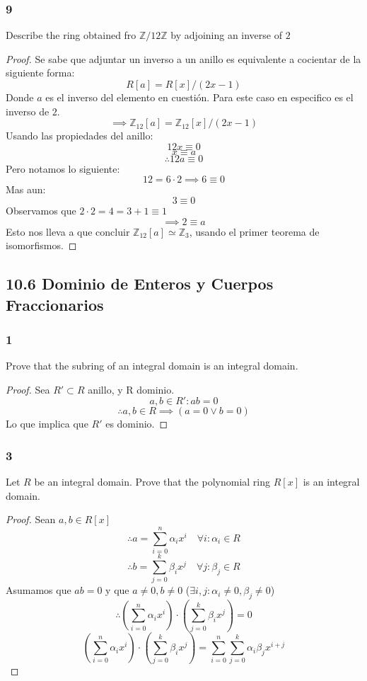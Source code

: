 \documentclass[11pt]{article}
\newcommand{\set}[1]{\mathbb{#1}}
\theoremstyle{definition}
\begin{document}
        \subsubsection{9}
        Describe the ring obtained fro $\set{Z}/12\set{Z}$ by adjoining an inverse of $2$
        \begin{proof}
            Se sabe que adjuntar un inverso a un anillo es equivalente a cocientar de la siguiente forma:
            \[R[a]=R[x]/(2x-1)\]
            Donde $a$ es el inverso del elemento en cuestión. Para este caso en especifico es el inverso de $2$.
            \[\implies\set{Z}_{12}[a]=\set{Z}_{12}[x]/(2x-1)\]
            Usando las propiedades del anillo:
            \[12x\equiv 0\]
            \[x\equiv a\]
            \[\therefore 12a\equiv 0\]
            Pero notamos lo siguiente:
            \[12=6\cdot 2\implies 6\equiv 0\]
            Mas aun:
            \[3\equiv 0\]
            Observamos que $2\cdot 2=4=3+1\equiv 1$
            \[\implies 2\equiv a\]
            Esto nos lleva a que concluir $\set{Z}_{12}[a]\simeq\set{Z}_3$, usando el primer teorema de isomorfismos.
        \end{proof}

        \subsection{10.6 Dominio de Enteros y Cuerpos Fraccionarios}
        \subsubsection{1}
        Prove that the subring of an integral domain is an integral domain.
        \begin{proof}
            Sea $R'\subset R$ anillo, y R dominio.
            \[a,b\in R': ab=0\]
            \[\therefore a,b\in R\implies(a=0\vee b=0)\]
            Lo que implica que $R'$ es dominio.
        \end{proof}

        \subsubsection{3}
        Let $R$ be an integral domain. Prove that the polynomial ring $R[x]$ is an integral domain.
        \begin{proof}
            Sean $a,b\in R[x]$
            \[\therefore a=\sum^n_{i=0}\alpha_ix^i\quad \forall i:\alpha_i\in R\]
            \[\therefore b=\sum^k_{j=0}\beta_ix^j\quad \forall j:\beta_j\in R\]
            Asumamos que $ab=0$ y que $a\neq 0,b\neq 0$ ($\exists i,j:\alpha_i\neq 0,\beta_j\neq 0$)
            \[\therefore \left(\sum^n_{i=0}\alpha_ix^i\right)\cdot\left(\sum^k_{j=0}\beta_ix^j\right)=0\]
            \[\left(\sum^n_{i=0}\alpha_ix^i\right)\cdot\left(\sum^k_{j=0}\beta_ix^j\right)=\sum^n_{i=0}\sum^k_{j=0}\alpha_i\beta_j x^{i+j}\]
        \end{proof}
\end{document}

